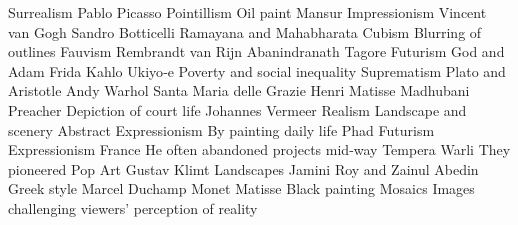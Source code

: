 \answerkey
{} Surrealism
 Pablo Picasso
 Pointillism
 Oil paint
 Mansur
 Impressionism
 Vincent van Gogh
 Sandro Botticelli
 Ramayana and Mahabharata
 Cubism
 Blurring of outlines
 Fauvism
 Rembrandt van Rijn
 Abanindranath Tagore
 Futurism
 God and Adam
 Frida Kahlo
 Ukiyo‑e
 Poverty and social inequality
 Suprematism
 Plato and Aristotle
 Andy Warhol
 Santa Maria delle Grazie
 Henri Matisse
 Madhubani
 Preacher
 Depiction of court life
 Johannes Vermeer
 Realism
 Landscape and scenery
 Abstract Expressionism
 By painting daily life
 Phad
 Futurism
 Expressionism
 France
 He often abandoned projects mid‑way
 Tempera
 Warli
 They pioneered Pop Art
 Gustav Klimt
 Landscapes
 Jamini Roy and Zainul Abedin
 Greek style
 Marcel Duchamp
 Monet
 Matisse
 Black painting
 Mosaics
 Images challenging viewers' perception of reality
\endanswerkey